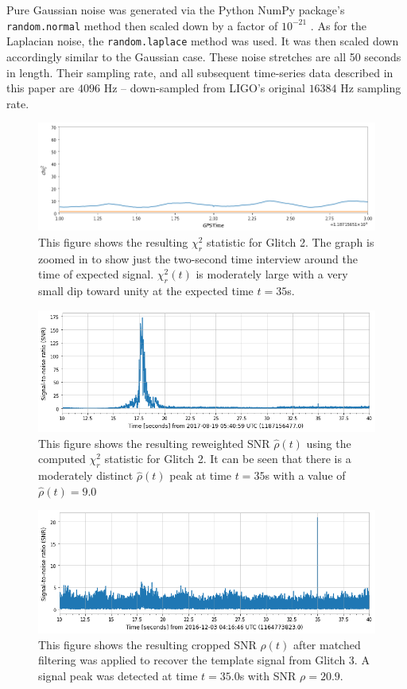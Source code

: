 \documentclass[preprint,
letterpaper,
 amsmath,amssymb,
 aps,
]{revtex4-2}
\def\code#1{\texttt{#1}}
\begin{document}
Pure Gaussian noise was generated via the Python NumPy package's \code{random.normal} method then scaled down by a factor of $10^{-21}$ \cite{numpy}. As for the Laplacian noise, the \code{random.laplace} method was used. It was then scaled down accordingly similar to the Gaussian case. These noise stretches are all 50 seconds in length. Their sampling rate, and all subsequent time-series data described in this paper are $4096$ Hz – down-sampled from LIGO's original $16384$ Hz sampling rate.

\begin{widetext}
\begin{figure}[t]
\includegraphics[width = .9\textwidth]{chi2 glitch 2.png}
\caption{This figure shows the resulting $\chi^2_r$ statistic for Glitch 2. The graph is zoomed in to show just the two-second time interview around the time of expected signal. $\chi_r^2(t)$ is moderately large with a very small dip toward unity at the expected time $t=35$s.}
\centering
\end{figure} 

\begin{figure}[t]
\includegraphics[width = .9\textwidth]{reweighted glitch 2.png}
\caption{This figure shows the resulting reweighted SNR $\hat{\rho}(t)$ using the computed $\chi^2_r$ statistic for Glitch 2. It can be seen that there is a moderately distinct $\hat{\rho}(t)$ peak at time $t=35$s with a value of $\hat{\rho}(t)=9.0$}
\centering
\end{figure}
\end{widetext}

\begin{figure}[t]\label{snr 3}
\includegraphics[width = .9\textwidth]{glitch 3 template 1.png}
\caption{This figure shows the resulting cropped SNR $\rho(t)$ after matched filtering was applied to recover the template signal from Glitch 3. A signal peak was detected at time $t = 35.0$s with SNR $\rho = 20.9$.}
\centering
\end{figure}
\end{document}
